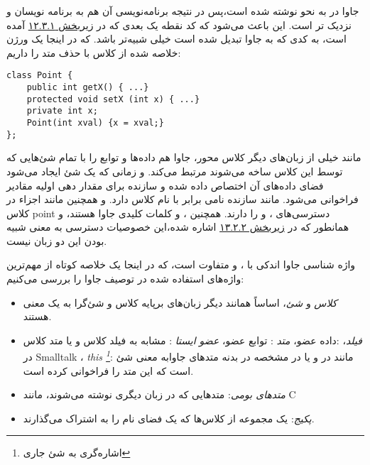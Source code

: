 \documentclass[a4paper,12pt]{report}
\newcommand{\lrInlineMono}[1]{{\color{steelBlue}\lr{\texttt{#1}}}}
\begin{document}
 	جاوا در به نحو 
 	نوشته شده است،‌پس در نتیجه برنامه‌نویسی آن هم به برنامه نویسان 
 	 و 
 	نزدیک تر است. این باعث می‌شود که کد نقطه یک بعدی که در 
 	\hyperref[subsec1:sec3:chap12]{
	زیربخش ۱۲.۳.۱} آمده است، به کدی که به جاوا تبدیل شده است خیلی شبیه‌تر باشد. که در اینجا یک ورژن خلاصه شده از کلاس با حذف متد 
 	را داریم:
 		
	\begin{latin}
		\small
		\begin{lstlisting}[]
class Point {
	public int getX() { ...}
	protected void setX (int x) { ...}
	private int x;
	Point(int xval) {x = xval;}
};		
		\end{lstlisting}
	\end{latin}	
			
	مانند خیلی از زبان‌های دیگر کلاس محور، جاوا هم داده‌ها و توابع را با تمام شئ‌هایی که توسط این کلاس ساخه می‌شوند مرتبط می‌کند. و زمانی که یک شئ ایجاد می‌شود فضای داده‌های آن اختصاص داده شده و سازنده برای مقدار دهی اولیه مقادیر فراخوانی می‌شود. مانند 
	سازنده نامی برابر با نام  کلاس دارد. و همچنین مانند 
	اجزاء در کلاس point ‌دسترسی‌های
	،  و 
	 را دارند.
	  همچنین
	،  و 
		کلمات کلیدی جاوا هستند، و همانطور که در 
	\linebreak\hyperref[subsec2:sec2:chap13]{زیربخش ۱۳.۲.۲} 
اشاره شده،‌این خصوصیات دسترسی به معنی شبیه بودن این دو زبان نیست.

	واژه شناسی جاوا اندکی با
	،  و 
	متفاوت است، که در اینجا یک خلاصه کوتاه از مهم‌ترین واژه‌های استفاده شده در توصیف جاوا را بررسی می‌کنیم:
	
	
	\begin{itemize}
		\renewcommand{\labelitemi}{\color{gray}\scriptsize$\blacksquare$}
		\item \textit{
		کلاس} و \textit{شئ}، اساساً همانند دیگر زبان‌های برپایه کلاس و شئ‌گرا به یک معنی هستند.
		
		\item \textit{
		فیلد}،
		:داده عضو،
		\textit{
		متد
		}: توابع عضو، 
		\textit{
		عضو ایستا
		}
		: مشابه به فیلد کلاس و یا متد کلاس در Smalltalk ،
		\textit{
		this \footnote{
		اشاره‌گری به شئ جاری}}: مانند 
		\lrInlineMono{this} در  
		و یا 
		\lrInlineMono{self} در  
		مشخصه
		 \lrInlineMono{this}
		  در بدنه متد‌های جاوابه معنی شئ است که این متد را فراخوانی کرده است.
		\item \textit{
		متدهای بومی}: متدهایی که در زبان دیگری نوشته می‌شوند، مانند C
		\item \textit{
		پکیج‌}: یک مجموعه از کلاس‌ها که یک فضای نام را به اشتراک می‌گذارند.
	\end{itemize}
\end{document}

